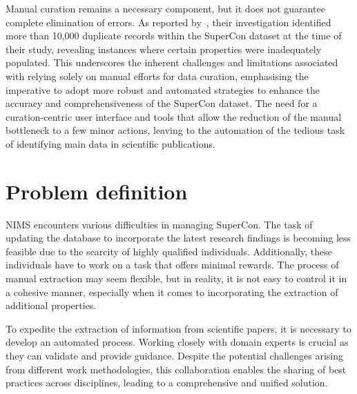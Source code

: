 Manual curation remains a necessary component, but it does not guarantee complete elimination of errors. As reported by~\cite{sommer20223dsc}, their investigation identified more than 10,000 duplicate records within the SuperCon dataset at the time of their study, revealing instances where certain properties were inadequately populated. 
This underscores the inherent challenges and limitations associated with relying solely on manual efforts for data curation, emphasising the imperative to adopt more robust and automated strategies to enhance the accuracy and comprehensiveness of the SuperCon dataset.
The need for a curation-centric user interface and tools that allow the reduction of the manual bottleneck to a few minor actions, leaving to the automation of the tedious task of identifying main data in scientific publications.


\section{Problem definition}

NIMS encounters various difficulties in managing SuperCon. The task of updating the database to incorporate the latest research findings is becoming less feasible due to the scarcity of highly qualified individuals. Additionally, these individuals have to work on a task that offers minimal rewards.
The process of manual extraction may seem flexible, but in reality, it is not easy to control it in a cohesive manner, especially when it comes to incorporating the extraction of additional properties.

To expedite the extraction of information from scientific papers, it is necessary to develop an automated process. Working closely with domain experts is crucial as they can validate and provide guidance. Despite the potential challenges arising from different work methodologies, this collaboration enables the sharing of best practices across disciplines, leading to a comprehensive and unified solution.

